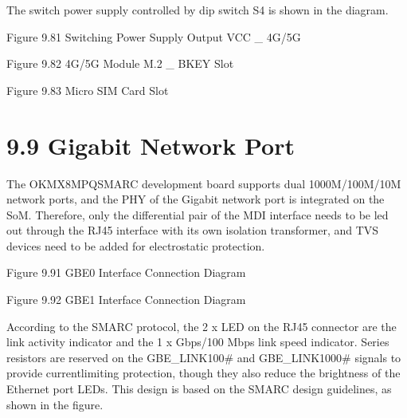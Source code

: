 \documentclass[letterpaper,10pt,openany,english]{sphinxmanual}
\begin{document}
\sphinxAtStartPar
The switch power supply controlled by dip switch S4 is shown in the diagram.

\sphinxAtStartPar
{}

\sphinxAtStartPar
Figure 9.8\sphinxhyphen{}1 Switching Power Supply Output VCC \_ 4G/5G

\sphinxAtStartPar
{}

\sphinxAtStartPar
Figure 9.8\sphinxhyphen{}2 4G/5G Module M.2 \_ B\sphinxhyphen{}KEY Slot

\sphinxAtStartPar
{}

\sphinxAtStartPar
Figure 9.8\sphinxhyphen{}3 Micro SIM Card Slot


\section{9.9 Gigabit Network Port}
\label{\detokenize{hardware:gigabit-network-port}}
\sphinxAtStartPar
The OK\sphinxhyphen{}MX8MPQ\sphinxhyphen{}SMARC development board supports dual 1000M/100M/10M network ports, and the PHY of the Gigabit network port is integrated on the SoM. Therefore, only the differential pair of the MDI interface needs to be led out through the RJ45 interface with its own isolation transformer, and TVS devices need to be added for electrostatic protection.

\sphinxAtStartPar
{}

\sphinxAtStartPar
Figure 9.9\sphinxhyphen{}1 GBE0 Interface Connection Diagram

\sphinxAtStartPar
{}

\sphinxAtStartPar
Figure 9.9\sphinxhyphen{}2 GBE1 Interface Connection Diagram

\sphinxAtStartPar
According to the SMARC protocol, the 2 x LED on the RJ45 connector are the link activity indicator and the 1 x Gbps/100 Mbps link speed indicator. Series resistors are reserved on the GBE\_LINK100\# and GBE\_LINK1000\# signals to provide current\sphinxhyphen{}limiting protection, though they also reduce the brightness of the Ethernet port LEDs. This design is based on the SMARC design guidelines, as shown in the figure.

\sphinxAtStartPar
{}
\end{document}
